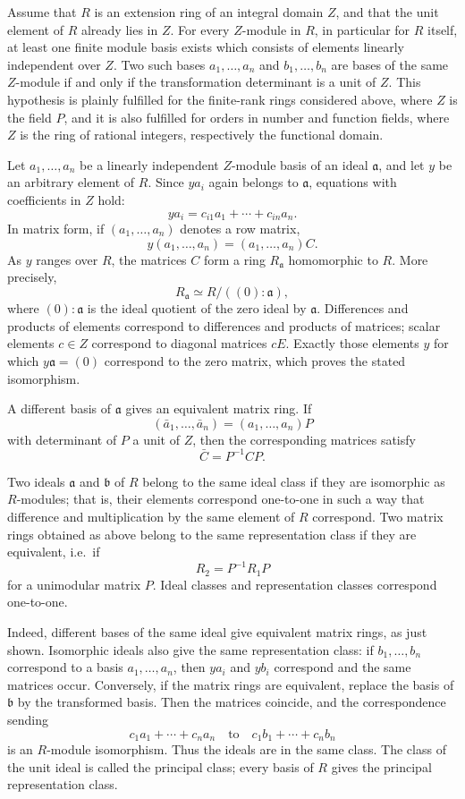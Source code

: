 \documentclass[11pt]{article}
\begin{document}
Assume that \(R\) is an extension ring of an integral domain \(Z\), and
that the unit element of \(R\) already lies in \(Z\). For every
\(Z\)-module in \(R\), in particular for \(R\) itself, at least one
finite module basis exists which consists of elements linearly
independent over \(Z\). Two such bases \(a_1,
\ldots,a_n\) and \(b_1,
\ldots,b_n\) are bases of the same \(Z\)-module if and only if the
transformation determinant is a unit of \(Z\). This hypothesis is
plainly fulfilled for the finite-rank rings considered above, where
\(Z\) is the field \(P\), and it is also fulfilled for orders in number
and function fields, where \(Z\) is the ring of rational integers,
respectively the functional domain.

Let \(a_1,
\ldots,a_n\) be a linearly independent \(Z\)-module basis of an ideal
\(\mathfrak a\), and let \(y\) be an arbitrary element of \(R\). Since
\(ya_i\) again belongs to \(\mathfrak a\), equations with coefficients
in \(Z\) hold: \[
  ya_i=c_{i1}a_1+
\cdots+c_{in}a_n.
\] In matrix form, if \((a_1,
\ldots,a_n)\) denotes a row matrix, \[
  y(a_1,
\ldots,a_n)=(a_1,
\ldots,a_n)C.
\] As \(y\) ranges over \(R\), the matrices \(C\) form a ring
\(R_{\mathfrak a}\) homomorphic to \(R\). More precisely, \[
  R_{\mathfrak a}\simeq R/((0):\mathfrak a),
\] where \((0):\mathfrak a\) is the ideal quotient of the zero ideal by
\(\mathfrak a\). Differences and products of elements correspond to
differences and products of matrices; scalar elements \(c\in Z\)
correspond to diagonal matrices \(cE\). Exactly those elements \(y\) for
which \(y\mathfrak a=(0)\) correspond to the zero matrix, which proves
the stated isomorphism.

A different basis of \(\mathfrak a\) gives an equivalent matrix ring. If
\[
  (\bar a_1,
\ldots,\bar a_n)=(a_1,
\ldots,a_n)P
\] with determinant of \(P\) a unit of \(Z\), then the corresponding
matrices satisfy \[
  \bar C=P^{-1}CP.
\]

Two ideals \(\mathfrak a\) and \(\mathfrak b\) of \(R\) belong to the
same ideal class if they are isomorphic as \(R\)-modules; that is, their
elements correspond one-to-one in such a way that difference and
multiplication by the same element of \(R\) correspond. Two matrix rings
obtained as above belong to the same representation class if they are
equivalent, i.e.~if \[
  R_2=P^{-1}R_1P
\] for a unimodular matrix \(P\). Ideal classes and representation
classes correspond one-to-one.

Indeed, different bases of the same ideal give equivalent matrix rings,
as just shown. Isomorphic ideals also give the same representation
class: if \(b_1,
\ldots,b_n\) correspond to a basis \(a_1,
\ldots,a_n\), then \(ya_i\) and \(yb_i\) correspond and the same
matrices occur. Conversely, if the matrix rings are equivalent, replace
the basis of \(\mathfrak b\) by the transformed basis. Then the matrices
coincide, and the correspondence sending \[
  c_1a_1+
\cdots+c_na_n
  \quad\text{to}\quad
  c_1b_1+
\cdots+c_nb_n
\] is an \(R\)-module isomorphism. Thus the ideals are in the same
class. The class of the unit ideal is called the principal class; every
basis of \(R\) gives the principal representation class.
\end{document}
